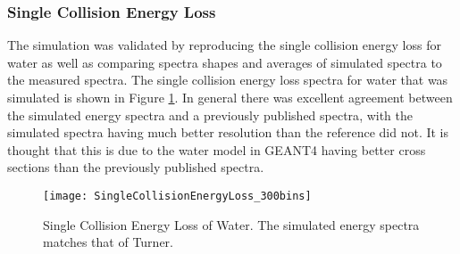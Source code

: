 \subsubsection{Single Collision Energy Loss}
The simulation was validated by reproducing the single collision energy loss for water as well as comparing spectra shapes and averages of simulated spectra to the measured spectra.
The single collision energy loss spectra for water that was simulated is shown in Figure \ref{fig:SingleCollisionELossWater}.
In general there was excellent agreement between the simulated energy spectra and a previously published spectra\cite{turner_comparative_1982}, with the simulated spectra having much better resolution than the reference did not.
It is thought that this is due to the water model in GEANT4 having better cross sections than the previously published spectra.
\begin{figure}[ht]
  \centering
  \texttt{[image: SingleCollisionEnergyLoss\_300bins]}
  \caption{Single Collision Energy Loss of Water. The simulated energy spectra matches that of Turner\cite{turner_comparative_1982}.}
	\label{fig:SingleCollisionELossWater}
\end{figure}

